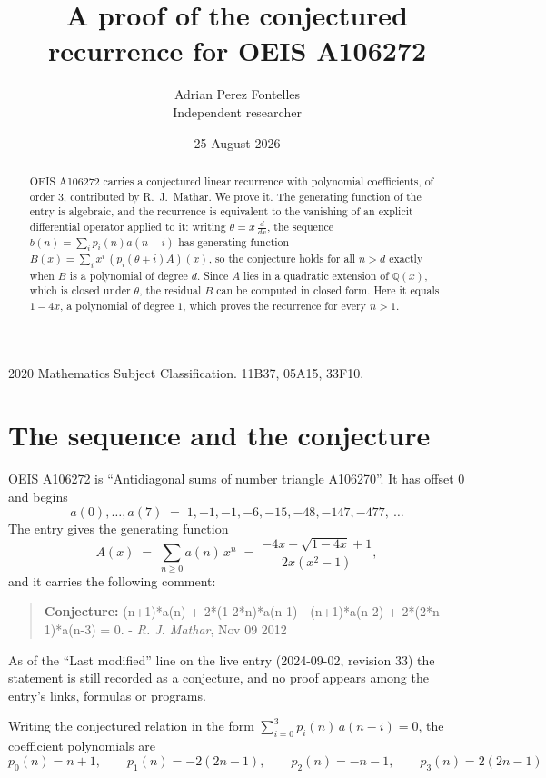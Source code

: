 \documentclass[11pt,a4paper]{article}
\title{A proof of the conjectured recurrence for OEIS A106272}
\author{Adrian Perez Fontelles\\ \small Independent researcher}
\date{25 August 2026}
\theoremstyle{plain}
\theoremstyle{definition}
\begin{document}
\maketitle

\begin{abstract}
OEIS A106272 carries a conjectured linear recurrence with polynomial coefficients, of
order 3, contributed by R.~J.~Mathar. We prove it. The generating function of the
entry is algebraic, and the recurrence is equivalent to the vanishing of an explicit
differential operator applied to it: writing $\theta=x\,\frac{d}{dx}$, the sequence
$b(n)=\sum_{i}p_{i}(n)a(n-i)$ has generating function
$B(x)=\sum_{i}x^{i}\,(p_{i}(\theta+i)A)(x)$, so the conjecture holds for all $n>d$ exactly
when $B$ is a polynomial of degree $d$. Since $A$ lies in a quadratic extension of
$\mathbb{Q}(x)$, which is closed under $\theta$, the residual $B$ can be computed in
closed form. Here it equals $1 - 4 x$, a polynomial of degree $1$, which proves
the recurrence for every $n>1$.
\end{abstract}

\noindent\small 2020 Mathematics Subject Classification. 11B37, 05A15, 33F10.\normalsize

\section{The sequence and the conjecture}

OEIS A106272 is ``Antidiagonal sums of number triangle A106270''. It has offset $0$ and begins
\[
a(0),\dots,a(7)\;=\;1, -1, -1, -6, -15, -48, -147, -477,\ \dots
\]
The entry gives the generating function
\begin{equation}\label{eq:gf}
A(x)\;=\;\sum_{n\ge 0} a(n)\,x^{n}\;=\;\frac{- 4 x - \sqrt{1 - 4 x} + 1}{2 x \left(x^{2} - 1\right)} ,
\end{equation}
and it carries the following comment:
\begin{quote}\small
\textbf{Conjecture:} (n+1)*a(n) + 2*(1-2*n)*a(n-1) - (n+1)*a(n-2) + 2*(2*n-1)*a(n-3) = 0. - \emph{R. J. Mathar}, Nov 09 2012
\end{quote}
As of the ``Last modified'' line on the live entry (2024-09-02, revision 33) the
statement is still recorded as a conjecture, and no proof appears among the entry's links,
formulas or programs.

Writing the conjectured relation in the form $\sum_{i=0}^{3}p_{i}(n)\,a(n-i)=0$,
the coefficient polynomials are
\[
p_{0}(n)=n + 1,\qquad p_{1}(n)=- 2 \left(2 n - 1\right),\qquad p_{2}(n)=- n - 1,\qquad p_{3}(n)=2 \left(2 n - 1\right)
\]
\end{document}
